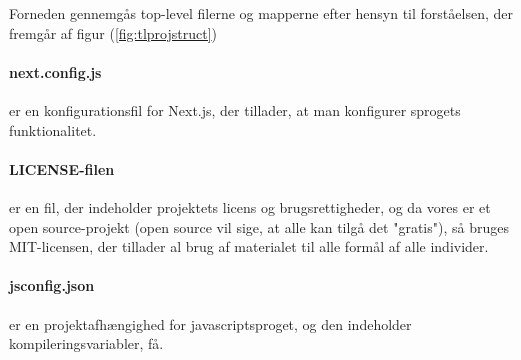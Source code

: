         Forneden gennemgås top-level filerne og mapperne efter hensyn til forståelsen, der fremgår af figur (\ref{fig:tlprojstruct})

        \paragraph{next.config.js} er en konfigurationsfil for Next.js, der tillader, at man konfigurer sprogets funktionalitet. 
        
        \paragraph{LICENSE-filen} er en fil, der indeholder projektets licens og brugsrettigheder, og da vores er et open source-projekt (open source vil sige, at alle kan tilgå det "gratis"), så bruges MIT-licensen, der tillader al brug af materialet til alle formål af alle individer. 
        
        \paragraph{jsconfig.json} er en projektafhængighed for javascriptsproget, og den indeholder kompileringsvariabler, få. 

